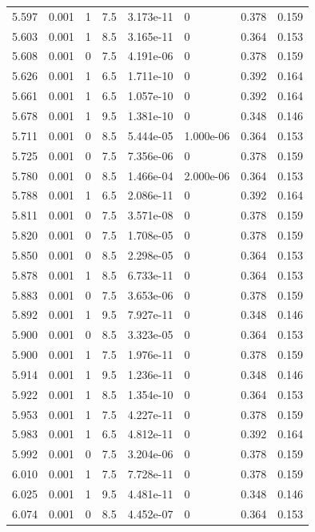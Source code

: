 \documentclass[preview]{standalone}
\begin{document}
{{{{\begin{tabular}{L{1.2cm}C{1.2cm} C{0.3cm}C{0.5cm} C{1.4cm}C{1.4cm} C{1.4cm}C{1.4cm}}
  5.597  &  0.001  & 1     & 7.5 &  3.173e-11  & 0  & 0.378 &  0.159   \\ 
  5.603  &  0.001  & 1     & 8.5 &  3.165e-11  & 0  & 0.364 &  0.153   \\ 
  5.608  &  0.001  & 0     & 7.5 &  4.191e-06  & 0  & 0.378 &  0.159   \\ 
  5.626  &  0.001  & 1     & 6.5 &  1.711e-10  & 0  & 0.392 &  0.164   \\ 
  5.661  &  0.001  & 1     & 6.5 &  1.057e-10  & 0  & 0.392 &  0.164   \\ 
  5.678  &  0.001  & 1     & 9.5 &  1.381e-10  & 0  & 0.348 &  0.146   \\ 
  5.711  &  0.001  & 0     & 8.5 &  5.444e-05  & 1.000e-06  & 0.364 &  0.153   \\ 
  5.725  &  0.001  & 0     & 7.5 &  7.356e-06  & 0  & 0.378 &  0.159   \\ 
  5.780  &  0.001  & 0     & 8.5 &  1.466e-04  & 2.000e-06  & 0.364 &  0.153   \\ 
  5.788  &  0.001  & 1     & 6.5 &  2.086e-11  & 0  & 0.392 &  0.164   \\ 
  5.811  &  0.001  & 0     & 7.5 &  3.571e-08  & 0  & 0.378 &  0.159   \\ 
  5.820  &  0.001  & 0     & 7.5 &  1.708e-05  & 0  & 0.378 &  0.159   \\ 
  5.850  &  0.001  & 0     & 8.5 &  2.298e-05  & 0  & 0.364 &  0.153   \\ 
  5.878  &  0.001  & 1     & 8.5 &  6.733e-11  & 0  & 0.364 &  0.153   \\ 
  5.883  &  0.001  & 0     & 7.5 &  3.653e-06  & 0  & 0.378 &  0.159   \\ 
  5.892  &  0.001  & 1     & 9.5 &  7.927e-11  & 0  & 0.348 &  0.146   \\ 
  5.900  &  0.001  & 0     & 8.5 &  3.323e-05  & 0  & 0.364 &  0.153   \\ 
  5.900  &  0.001  & 1     & 7.5 &  1.976e-11  & 0  & 0.378 &  0.159   \\ 
  5.914  &  0.001  & 1     & 9.5 &  1.236e-11  & 0  & 0.348 &  0.146   \\ 
  5.922  &  0.001  & 1     & 8.5 &  1.354e-10  & 0  & 0.364 &  0.153   \\ 
  5.953  &  0.001  & 1     & 7.5 &  4.227e-11  & 0  & 0.378 &  0.159   \\ 
  5.983  &  0.001  & 1     & 6.5 &  4.812e-11  & 0  & 0.392 &  0.164   \\ 
  5.992  &  0.001  & 0     & 7.5 &  3.204e-06  & 0  & 0.378 &  0.159   \\ 
  6.010  &  0.001  & 1     & 7.5 &  7.728e-11  & 0  & 0.378 &  0.159   \\ 
  6.025  &  0.001  & 1     & 9.5 &  4.481e-11  & 0  & 0.348 &  0.146   \\ 
  6.074  &  0.001  & 0     & 8.5 &  4.452e-07  & 0  & 0.364 &  0.153   \\ 
\hline 
\end{tabular} 

}}}}
\end{document}
